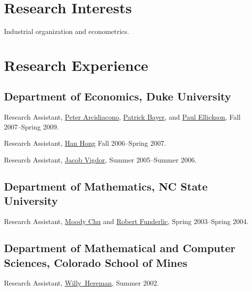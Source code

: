 \documentclass[letterpaper]{article}
\renewenvironment{itemize}{
  \begin{list}{}
    { \setlength{\itemsep}{5pt}
      \setlength{\parsep}{0pt}
      \setlength{\topsep}{0pt}
      \setlength{\leftmargin}{0em} } }{
  \end{list}}
\begin{document}
\section*{Research Interests}

Industrial organization and econometrics.


\section*{Research Experience}

\subsection*{Department of Economics, Duke University}

\begin{itemize}
\item Research Assistant,
  \href{http://www.econ.duke.edu/~psarcidi/}{Peter Arcidiacono},
  \href{http://www.econ.duke.edu/~pb29/}{Patrick Bayer}, and
  \href{http://www.econ.duke.edu/~paule/}{Paul Ellickson},
  Fall 2007--Spring 2009.
\item Research Assistant,
  \href{http://www.stanford.edu/~doubleh/}{Han Hong}  
  Fall 2006--Spring 2007.
\item Research Assistant,
  \href{http://trinity.aas.duke.edu/~jvigdor/}{Jacob Vigdor},
  Summer 2005--Summer 2006.
\end{itemize}

\subsection*{Department of Mathematics, NC State University}

\begin{itemize}
\item Research Assistant,
  \href{http://www4.ncsu.edu/~mtchu/}{Moody Chu} and
  \href{http://www4.ncsu.edu/~ref/}{Robert Funderlic},
  Spring 2003--Spring 2004.
\end{itemize}

\subsection*{Department of Mathematical and Computer Sciences,
  Colorado School of Mines}

\begin{itemize}
\item Research Assistant,
  \href{http://www.mines.edu/fs_home/whereman/}{Willy\ Hereman},
  Summer 2002.
\end{itemize}
\end{document}

